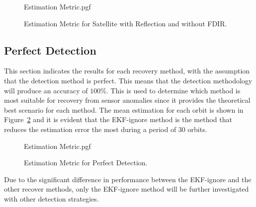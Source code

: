 \documentclass[letterpaper, 10 pt, conference]{ieeeconf}  %
\begin{document}

\begin{figure}[!htb]
	\begin{center}
	{Estimation Metric.pgf}
	\end{center}
	\caption[Estimation Metric for Satellite with Reflection and without FDIR]{Estimation Metric for Satellite with Reflection and without FDIR.}
	\label{fig:Estimation Accuracy Reflection}
\end{figure}

\subsection{Perfect Detection}
This section indicates the results for each recovery method, with the assumption that the detection method is perfect. This means that the detection methodology will produce an accuracy of $100\%$. This is used to determine which method is most suitable for recovery from sensor anomalies since it provides the theoretical best scenario for each method. The mean estimation for each orbit is shown in Figure~\ref{fig:Estimation Metric Summary} and it is evident that the EKF-ignore method is the method that reduces the estimation error the most during a period of $30$ orbits. 

\begin{figure}[!htb]
	\begin{center}
		{Estimation Metric.pgf}
	\end{center}
	\caption[Estimation Metric for Perfect Detection]{Estimation Metric for Perfect Detection.}
	\label{fig:Estimation Metric Summary}
\end{figure}

Due to the significant difference in performance between the EKF-ignore and the other recover methods, only the EKF-ignore method will be further investigated with other detection strategies.
\end{document}
